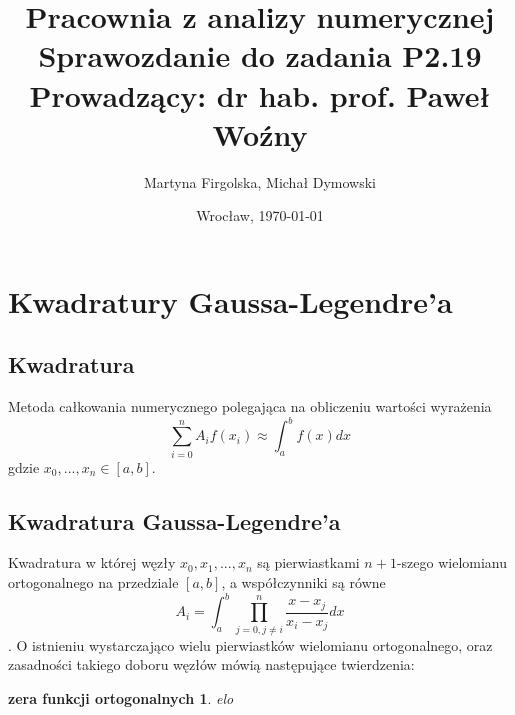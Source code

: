 \documentclass{article}
\title{
	\textbf{Pracownia z analizy numerycznej}\\[8pt]
	\large{Sprawozdanie do zadania \textbf{P2.19}\\
	Prowadzący: dr hab. prof. Paweł Woźny}}
\author{\large{Martyna Firgolska, Michał Dymowski}}
\date{\large{Wrocław, \today}}
\newtheorem{theorem}{zera funkcji ortogonalnych}
\begin{document}
\maketitle 

\section*{Kwadratury Gaussa-Legendre'a}

\subsection*{Kwadratura} 
Metoda całkowania numerycznego polegająca na obliczeniu wartości wyrażenia
\[ \sum_{i=0}^n A_if(x_i) \approx \int_a^b f(x) d x \] 
gdzie $x_0,...,x_n\in [a,b]$.

\subsection*{Kwadratura Gaussa-Legendre'a}
Kwadratura w której węzły $x_0,x_1,...,x_n$ są pierwiastkami $n+1$-szego
wielomianu ortogonalnego na przedziale $[a,b]$, a współczynniki są równe
\[A_i=\int_a^b \prod_{j=0,j\neq i}^n \frac{x-x_j}{x_i-x_j} dx\]. O istnieniu
wystarczająco wielu pierwiastków wielomianu ortogonalnego, oraz zasadności 
takiego doboru węzłów mówią następujące twierdzenia: 

\begin{theorem}
	elo
\end{theorem}
\end{document}
